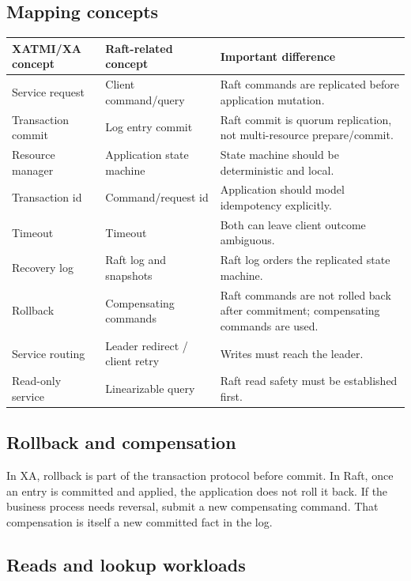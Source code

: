 \subsection{Mapping concepts}

\begin{longtable}{p{48mm}p{52mm}p{52mm}}
\toprule
XATMI/XA concept & Raft-related concept & Important difference \\
\midrule
Service request & Client command/query &
Raft commands are replicated before application mutation. \\
\midrule
Transaction commit & Log entry commit &
Raft commit is quorum replication, not multi-resource prepare/commit. \\
\midrule
Resource manager & Application state machine &
State machine should be deterministic and local. \\
\midrule
Transaction id & Command/request id &
Application should model idempotency explicitly. \\
\midrule
Timeout & Timeout &
Both can leave client outcome ambiguous. \\
\midrule
Recovery log & Raft log and snapshots &
Raft log orders the replicated state machine. \\
\midrule
Rollback & Compensating commands &
Raft commands are not rolled back after commitment; compensating commands
are used. \\
\midrule
Service routing & Leader redirect / client retry &
Writes must reach the leader. \\
\midrule
Read-only service & Linearizable query &
Raft read safety must be established first. \\
\bottomrule
\end{longtable}

\subsection{Rollback and compensation}

In XA, rollback is part of the transaction protocol before commit. In
Raft, once an entry is committed and applied, the application does not
roll it back. If the business process needs reversal, submit a new
compensating command. That compensation is itself a new committed fact in
the log.

\subsection{Reads and lookup workloads}

